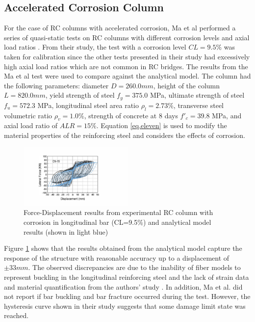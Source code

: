 \subsection{Accelerated Corrosion Column}
For the case of RC columns with accelerated corrosion, Ma et al performed a series of quasi-static tests on RC columns with different corrosion levels and axial load ratios \cite{Ma2012}. From their study, the test with a corrosion level $CL=9.5\%$ was taken for calibration since the other tests presented in their study had excessively high axial load ratios which are not common in RC bridges. The results from the Ma et al test \cite{Ma2012} were used to compare against the analytical model. The column had the following parameters: diameter $D = 260.0 mm$, height of the column $L = 820.0 mm$, yield strength of steel $f_{y} = 375.0$ MPa, ultimate strength of steel $f_{u} = 572.3$ MPa, longitudinal steel area ratio $\rho_{l} = 2.73\% $, transverse steel volumetric ratio $\rho_{v} = 1.0\% $, strength of concrete at 8 days $f'_{c} = 39.8$ MPa, and axial load ratio of $ALR=15\%$. Equation \ref{eq.eleven} is used to modify the material properties of the reinforcing steel and considers the effects of corrosion. 

\begin{figure}[htbp]
	\centering
	\includegraphics[width=0.50\textwidth]{Chapter-5/figs/Model_vs_MaEtAl_220218.pdf}
	\caption{Force-Displacement results from experimental RC column with corrosion in longitudinal bar (CL=9.5\%) \cite{Ma2012} and analytical model results (shown in light blue)}
	\label{fig:ModelCalibration_Corrosion}
\end{figure}

Figure \ref{fig:ModelCalibration_Corrosion} shows that the results obtained from the analytical model capture the response of the structure with reasonable accuracy up to a displacement of $\pm 33 mm$. The observed discrepancies are due to the inability of fiber models to represent buckling in the longitudinal reinforcing steel and the lack of strain data and material quantification from the authors' study \cite{Ma2012}. In addition, Ma et al. \cite{Ma2012} did not report if bar buckling and bar fracture occurred during the test. However, the hysteresis curve shown in their study suggests that some damage limit state was reached. 

